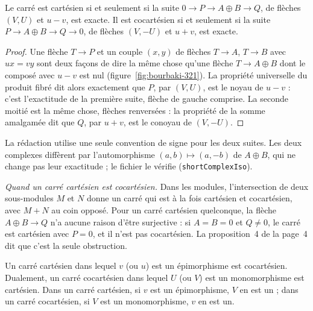 \begin{encadre}
\begin{enonce}
Le carré est cartésien si et seulement si la suite $0 \to P \to A \oplus B \to Q$, de flèches $(V, U)$ et $u - v$, est exacte. Il est cocartésien si et seulement si la suite $P \to A \oplus B \to Q \to 0$, de flèches $(V, -U)$ et $u + v$, est exacte.
\end{enonce}
\end{encadre}

\begin{proof}
Une flèche $T \to P$ et un couple $(x, y)$ de flèches $T \to A$, $T \to B$ avec $ux = vy$ sont deux façons de dire la même chose qu'une flèche $T \to A \oplus B$ dont le composé avec $u - v$ est nul (figure~\ref{fig:bourbaki-321}). La propriété universelle du produit fibré dit alors exactement que $P$, par $(V, U)$, est le noyau de $u - v$ : c'est l'exactitude de la première suite, flèche de gauche comprise. La seconde moitié est la même chose, flèches renversées : la propriété de la somme amalgamée dit que $Q$, par $u + v$, est le conoyau de $(V, -U)$.
\end{proof}

\noindent La rédaction utilise une seule convention de signe pour les deux suites. Les deux complexes diffèrent par l'automorphisme $(a, b) \mapsto (a, -b)$ de $A \oplus B$, qui ne change pas leur exactitude ; le fichier le vérifie (\texttt{shortComplexIso}).

\emph{Quand un carré cartésien est cocartésien.} Dans les modules, l'intersection de deux sous-modules $M$ et $N$ donne un carré qui est à la fois cartésien et cocartésien, avec $M + N$ au coin opposé. Pour un carré cartésien quelconque, la flèche $A \oplus B \to Q$ n'a aucune raison d'être surjective : si $A = B = 0$ et $Q \neq 0$, le carré est cartésien avec $P = 0$, et il n'est pas cocartésien. La proposition~4 de la page~4 dit que c'est la seule obstruction.

\begin{encadre}
\begin{enonce}
Un carré cartésien dans lequel $v$ (ou $u$) est un épimorphisme est cocartésien. Dualement, un carré cocartésien dans lequel $U$ (ou $V$) est un monomorphisme est cartésien. Dans un carré cartésien, si $v$ est un épimorphisme, $V$ en est un ; dans un carré cocartésien, si $V$ est un monomorphisme, $v$ en est un.
\end{enonce}
\end{encadre}

